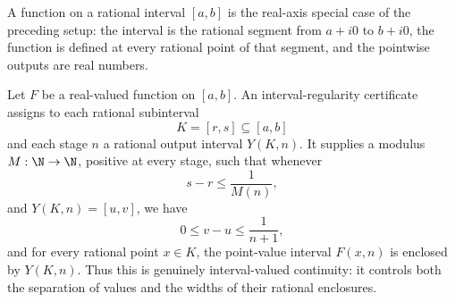 \begin{definition}\label{def:function-on-interval}
A function on a rational interval \([a,b]\) is the real-axis special case of
the preceding setup: the interval is the rational segment from \(a+i0\) to
\(b+i0\), the function is defined at every rational point of that segment, and
the pointwise outputs are real numbers.
\end{definition}

\begin{definition}\label{def:interval-regular}
Let \(F\) be a real-valued function on \([a,b]\).  An interval-regularity
certificate assigns to each rational subinterval
\[
  K=[r,s]\subseteq [a,b]
\]
and each stage \(n\) a rational output interval \(Y(K,n)\).  It supplies a
modulus \(M:\N\to\N\), positive at every stage, such that whenever
\[
  s-r\le \frac{1}{M(n)},
\]
and \(Y(K,n)=[u,v]\), we have
\[
  0\le v-u\le \frac{1}{n+1},
\]
and for every rational point \(x\in K\), the point-value interval
\(F(x,n)\) is enclosed by \(Y(K,n)\).  Thus this is genuinely
interval-valued continuity: it controls both the separation of values and
the widths of their rational enclosures.
\end{definition}

